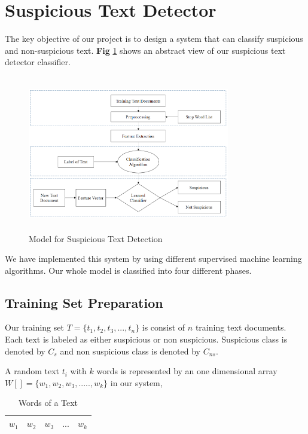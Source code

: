 \section{\textbf{Suspicious Text Detector}}
The key objective of our project is to design a system that can classify suspicious and non-suspicious text. \textbf{Fig} \ref{fig:proposed_model} shows an abstract view of our suspicious text detector classifier.

\begin{figure}[h!]
\centering
  \includegraphics[height=6.8cm, width=8.8cm]{Figures/pr_model.PNG}
  \caption{ Model for Suspicious Text Detection}
  \label{fig:proposed_model}
\end{figure}

We have implemented this system by using different supervised machine learning algorithms. Our whole model is classified into four different phases.
\subsection{\textbf {Training Set Preparation}}
Our training set $T = \{t_1, t_2, t_3, ..., t_n\}$ is consist of $n$ training text documents. Each text is labeled as either suspicious or non suspicious. Suspicious class is denoted by $C_s$ and non suspicious class is denoted by $C_{ns}$.\par
A random text $t_i$ with $k$ words is represented by an one dimensional array $W[] =\{w_1, w_2, w_3, ....., w_k\}$ in our system,
\begin{table}[h!]
\begin{center}
\caption{Words of a Text}
\begin{tabular}{|m{1cm} | m{1cm}| m{1cm}|m{1cm} | m{1cm}|}
\hline
     $w_1$ & $w_2$  & $w_3$ & $...$ & $w_k$  \\
\hline
\end{tabular}
\end{center}
\end{table}

